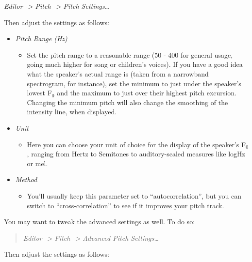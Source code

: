 \documentclass[11pt]{article}
\def\tightlist{}
\begin{document}
\emph{Editor -\textgreater{} Pitch -\textgreater{} Pitch
Settings\ldots{}}

Then adjust the settings as follows:

\begin{itemize}
\tightlist
\item
  \emph{Pitch Range (Hz)}

  \begin{itemize}
  \tightlist
  \item
    Set the pitch range to a reasonable range (50 - 400 for general
    usage, going much higher for song or children's voices). If you have
    a good idea what the speaker's actual range is (taken from a
    narrowband spectrogram, for instance), set the minimum to just under
    the speaker's lowest F$_{0}$ and the maximum to just over their highest
    pitch excursion. Changing the minimum pitch will also change the
    smoothing of the intensity line, when displayed.
  \end{itemize}
\item
  \emph{Unit}

  \begin{itemize}
  \tightlist
  \item
    Here you can choose your unit of choice for the display of the
    speaker's F$_{0}$, ranging from Hertz to Semitones to auditory-scaled
    measures like logHz or mel.
  \end{itemize}
\item
  \emph{Method}

  \begin{itemize}
  \tightlist
  \item
    You'll usually keep this parameter set to ``autocorrelation'', but
    you can switch to ``cross-correlation'' to see if it improves your
    pitch track.
  \end{itemize}
\end{itemize}

You may want to tweak the advanced settings as well. To do so:

\begin{quote}
\emph{Editor -\textgreater{} Pitch -\textgreater{} Advanced Pitch
Settings\ldots{}}
\end{quote}

Then adjust the settings as follows:
\end{document}
